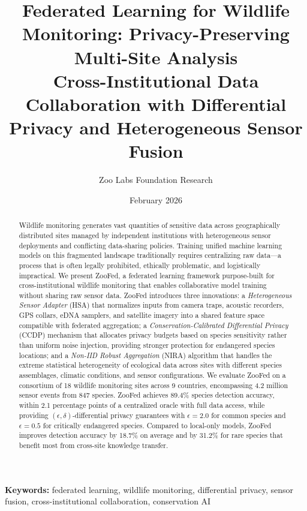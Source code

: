 \documentclass[11pt,a4paper]{article}
\title{\textbf{Federated Learning for Wildlife Monitoring: Privacy-Preserving Multi-Site Analysis} \\[0.5em]
\large Cross-Institutional Data Collaboration with Differential Privacy and Heterogeneous Sensor Fusion}
\author[1]{Zoo Labs Foundation Research}
\affil[1]{Zoo Labs Foundation, Research Division \\ \texttt{research@zoo.ngo}}
\date{February 2026}
\begin{document}
\maketitle

\begin{abstract}
\noindent
Wildlife monitoring generates vast quantities of sensitive data across geographically distributed sites managed by independent institutions with heterogeneous sensor deployments and conflicting data-sharing policies.
Training unified machine learning models on this fragmented landscape traditionally requires centralizing raw data---a process that is often legally prohibited, ethically problematic, and logistically impractical.
We present ZooFed, a federated learning framework purpose-built for cross-institutional wildlife monitoring that enables collaborative model training without sharing raw sensor data.
ZooFed introduces three innovations: a \emph{Heterogeneous Sensor Adapter} (HSA) that normalizes inputs from camera traps, acoustic recorders, GPS collars, eDNA samplers, and satellite imagery into a shared feature space compatible with federated aggregation; a \emph{Conservation-Calibrated Differential Privacy} (CCDP) mechanism that allocates privacy budgets based on species sensitivity rather than uniform noise injection, providing stronger protection for endangered species locations; and a \emph{Non-IID Robust Aggregation} (NIRA) algorithm that handles the extreme statistical heterogeneity of ecological data across sites with different species assemblages, climatic conditions, and sensor configurations.
We evaluate ZooFed on a consortium of 18 wildlife monitoring sites across 9 countries, encompassing 4.2 million sensor events from 847 species.
ZooFed achieves 89.4\% species detection accuracy, within 2.1 percentage points of a centralized oracle with full data access, while providing $(\epsilon, \delta)$-differential privacy guarantees with $\epsilon = 2.0$ for common species and $\epsilon = 0.5$ for critically endangered species.
Compared to local-only models, ZooFed improves detection accuracy by 18.7\% on average and by 31.2\% for rare species that benefit most from cross-site knowledge transfer.
\end{abstract}

\vspace{0.5em}
\noindent\textbf{Keywords:} federated learning, wildlife monitoring, differential privacy, sensor fusion, cross-institutional collaboration, conservation AI
\end{document}

